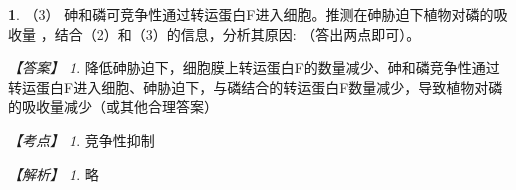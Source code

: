 \documentclass[UTF8, 10pt, a4paper, oneside]{ctexart}
\newcommand{\blank}{ \underbar{\quad$\blacktriangle$\quad} }%
\newcommand{\fs}[1]{{\fangsong #1}}%
\theoremstyle{definition}
\newtheorem{exercise}{}
\theoremstyle{remark}
\newtheorem*{answer}{【答案】}
\newtheorem*{point}{【考点】}      %
\newtheorem*{explanation}{【解析】}     %
\theoremstyle{plain}
\begin{document}
\begin{exercise}
    （3） 砷和磷可竞争性通过转运蛋白F进入细胞。推测在砷胁迫下植物对磷的吸收量 \blank，结合（2）和（3）的信息，分析其原因:\blank（答出两点即可）。

        \begin{answer}
        降低\qquad 砷胁迫下，细胞膜上转运蛋白F的数量减少、砷和磷竞争性通过转运蛋白F进入细胞、砷胁迫下，与磷结合的转运蛋白F数量减少，导致植物对磷的吸收量减少（或其他合理答案）
    \end{answer}
    \begin{point}
        竞争性抑制
    \end{point}
    \begin{explanation}
        \fs{略}
    \end{explanation}














\end{exercise}
\end{document}
